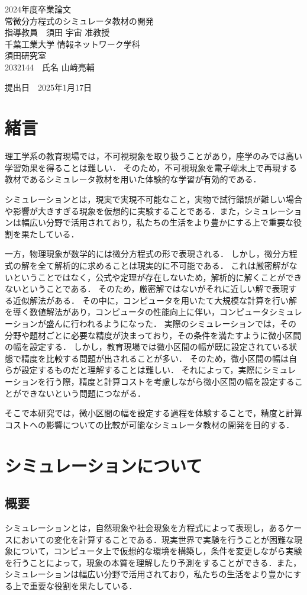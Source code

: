 \documentclass[a4paper, 12pt]{ltjsarticle}
\newcommand{\coverpage}{
\begin{titlepage}
\begin{center}
\vspace*{1.5cm}

{\LARGE 2024年度卒業論文}\\[2cm] %

{\Huge {常微分方程式のシミュレータ教材の開発}}\\[4cm] %

{\LARGE 指導教員　須田 宇宙 准教授}\\[2cm] %
{\LARGE 千葉工業大学 情報ネットワーク学科}\\[0.5cm] %

{\LARGE 須田研究室}\\[2.5cm] %

{\LARGE {2032144}　氏名 {山﨑亮輔}} \\[1.5cm] %

\vfill
\end{center}

\begin{flushright}
{\LARGE 提出日　\textnormal{2025年1月17日}}\\[1.5cm] %
\end{flushright}

\vfill
\end{titlepage}
}
\begin{document}
\coverpage

\tableofcontents

\clearpage

\section{緒言}
理工学系の教育現場では，不可視現象を取り扱うことがあり，座学のみでは高い学習効果を得ることは難しい．
そのため，不可視現象を電子端末上で再現する教材であるシミュレータ教材を用いた体験的な学習が有効的である\cite{suda2018}．

シミュレーションとは，現実で実現不可能なこと，実物で試行錯誤が難しい場合や影響が大きすぎる現象を仮想的に実験することである．また，シミュレーションは幅広い分野で活用されており，私たちの生活をより豊かにする上で重要な役割を果たしている．

一方，物理現象が数学的には微分方程式の形で表現される．
しかし，微分方程式の解を全て解析的に求めることは現実的に不可能である．
これは厳密解がないということではなく，公式や定理が存在しないため，解析的に解くことができないということである．
そのため，厳密解ではないがそれに近しい解で表現する近似解法がある．
その中に，コンピュータを用いたて大規模な計算を行い解を導く数値解法があり，コンピュータの性能向上に伴い，コンピュータシミュレーションが盛んに行われるようになった．
実際のシミュレーションでは，その分野や題材ごとに必要な精度が決まっており，その条件を満たすように微小区間の幅を設定する．
しかし，教育現場では微小区間の幅が既に設定されている状態で精度を比較する問題が出されることが多い．
そのため，微小区間の幅は自らが設定するものだと理解することは難しい．
それによって，実際にシミュレーションを行う際，精度と計算コストを考慮しながら微小区間の幅を設定することができないという問題につながる．

そこで本研究では，微小区間の幅を設定する過程を体験することで，精度と計算コストへの影響についての比較が可能なシミュレータ教材の開発を目的する．
\clearpage
\section{シミュレーションについて}
\subsection{概要}
シミュレーションとは，自然現象や社会現象を方程式によって表現し，あるケースにおいての変化を計算することである．現実世界で実験を行うことが困難な現象について，コンピュータ上で仮想的な環境を構築し，条件を変更しながら実験を行うことによって，現象の本質を理解したり予測をすることができる．また，シミュレーションは幅広い分野で活用されており，私たちの生活をより豊かにする上で重要な役割を果たしている．
\end{document}
